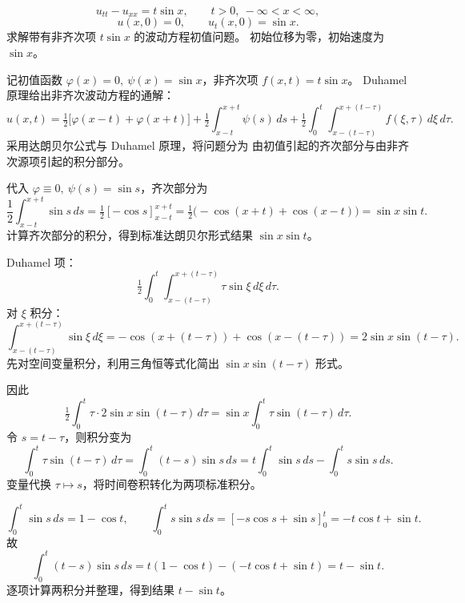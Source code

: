 \begin{solution}
    \begin{dxsolution}
\[
u_{tt}-u_{xx}=t\sin x,\qquad t>0,\ -\infty<x<\infty,
\]
\[
u(x,0)=0,\qquad u_t(x,0)=\sin x.
\]
\tcblower
求解带有非齐次项 $t\sin x$ 的波动方程初值问题。  
初始位移为零，初始速度为 $\sin x$。
\end{dxsolution}

\begin{dxsolution}
记初值函数 $\varphi(x)=0,\ \psi(x)=\sin x$，非齐次项 $f(x,t)=t\sin x$。  
Duhamel 原理给出非齐次波动方程的通解：
\[
u(x,t)
=\tfrac12\bigl[\varphi(x-t)+\varphi(x+t)\bigr]
+\tfrac12\int_{x-t}^{x+t}\psi(s)\,ds
+\tfrac12\int_{0}^{t}\!\!\int_{x-(t-\tau)}^{x+(t-\tau)} f(\xi,\tau)\,d\xi\,d\tau.
\]
\tcblower
采用达朗贝尔公式与 Duhamel 原理，将问题分为  
由初值引起的齐次部分与由非齐次源项引起的积分部分。
\end{dxsolution}

\begin{dxsolution}
代入 $\varphi\equiv0,\ \psi(s)=\sin s$，齐次部分为
\[
\frac12\int_{x-t}^{x+t}\sin s\,ds
=\tfrac12[-\cos s]_{x-t}^{x+t}
=\tfrac12\bigl(-\cos(x+t)+\cos(x-t)\bigr)
=\sin x\sin t.
\]
\tcblower
计算齐次部分的积分，得到标准达朗贝尔形式结果 $\sin x\sin t$。
\end{dxsolution}

\begin{dxsolution}
Duhamel 项：
\[
\tfrac12\int_{0}^{t}\int_{x-(t-\tau)}^{x+(t-\tau)} \tau\sin\xi\,d\xi\,d\tau.
\]
对 $\xi$ 积分：
\[
\int_{x-(t-\tau)}^{x+(t-\tau)}\sin\xi\,d\xi
=-\cos(x+(t-\tau))+\cos(x-(t-\tau))
=2\sin x\sin(t-\tau).
\]
\tcblower
先对空间变量积分，利用三角恒等式化简出 $\sin x\sin(t-\tau)$ 形式。
\end{dxsolution}

\begin{dxsolution}
因此
\[
\tfrac12\int_{0}^{t} \tau\cdot 2\sin x\sin(t-\tau)\,d\tau
= \sin x\int_{0}^{t}\tau\sin(t-\tau)\,d\tau.
\]
令 \(s=t-\tau\)，则积分变为
\[
\int_{0}^{t}\tau\sin(t-\tau)\,d\tau
=\int_{0}^{t}(t-s)\sin s\,ds
= t\int_{0}^{t}\sin s\,ds-\int_{0}^{t}s\sin s\,ds.
\]
\tcblower
变量代换 $\tau\mapsto s$，将时间卷积转化为两项标准积分。
\end{dxsolution}

\begin{dxsolution}
\[
\int_{0}^{t}\sin s\,ds=1-\cos t,\qquad
\int_{0}^{t}s\sin s\,ds=[-s\cos s+\sin s]_{0}^{t}=-t\cos t+\sin t.
\]
故
\[
\int_{0}^{t}(t-s)\sin s\,ds
=t(1-\cos t)-(-t\cos t+\sin t)
=t-\sin t.
\]
\tcblower
逐项计算两积分并整理，得到结果 $t-\sin t$。
\end{dxsolution}


\end{solution}
